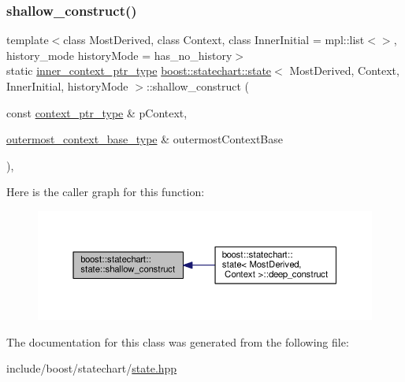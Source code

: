 \subsubsection{\texorpdfstring{shallow\+\_\+construct()}{shallow\_construct()}}
{\footnotesize\ttfamily template$<$class Most\+Derived, class Context, class Inner\+Initial = mpl\+::list$<$$>$, history\+\_\+mode history\+Mode = has\+\_\+no\+\_\+history$>$ \\
static \mbox{\hyperlink{classboost_1_1statechart_1_1simple__state_ad6d3233a11a23e91b4cc9edcae799379}{inner\+\_\+context\+\_\+ptr\+\_\+type}} \mbox{\hyperlink{classboost_1_1statechart_1_1state}{boost\+::statechart\+::state}}$<$ Most\+Derived, Context, Inner\+Initial, history\+Mode $>$\+::shallow\+\_\+construct (\begin{DoxyParamCaption}\item[{const \mbox{\hyperlink{classboost_1_1statechart_1_1simple__state_ac7e361322d53b3f57976ff23056b59e7}{context\+\_\+ptr\+\_\+type}} \&}]{p\+Context,  }\item[{\mbox{\hyperlink{classboost_1_1statechart_1_1simple__state_a50f21d7a7d6632eb34430e74cbad3197}{outermost\+\_\+context\+\_\+base\+\_\+type}} \&}]{outermost\+Context\+Base }\end{DoxyParamCaption})\hspace{0.3cm}{\ttfamily [inline]}, {\ttfamily [static]}}

Here is the caller graph for this function\+:
\nopagebreak
\begin{figure}[H]
\begin{center}
\leavevmode
\includegraphics[width=350pt]{classboost_1_1statechart_1_1state_afd7debb4aea8513b34941ba356767701_icgraph}
\end{center}
\end{figure}


The documentation for this class was generated from the following file\+:\begin{DoxyCompactItemize}
\item 
include/boost/statechart/\mbox{\hyperlink{state_8hpp}{state.\+hpp}}\end{DoxyCompactItemize}
